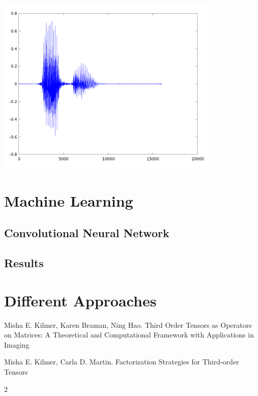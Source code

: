 \documentclass[twoside]{article}
\newenvironment{Figure}
  {\par\medskip\noindent\minipage{\linewidth}}
  {\endminipage\par\medskip}
\begin{document}
\begin{multicols}{2}
\begin{Figure}
	\centering
	\includegraphics[width=0.8\textwidth]{happy-read}
	\label{img:pocetnoStanje}
\end{Figure}
\section{Machine Learning}

\subsection{Convolutional Neural Network}

\subsection{Results}

\section{Different Approaches}





\begin{thebibliography}{99}

Misha E. Kilmer, Karen Braman, Ning Hao.
\newblock Third Order Tensors as Operators on Matrices: A
Theoretical and Computational Framework with
Applications in Imaging

Misha E. Kilmer, Carla D. Martin.
\newblock Factorization Strategies for Third-order Tensors

 
\end{thebibliography}


\end{multicols}{2}
\end{document}
